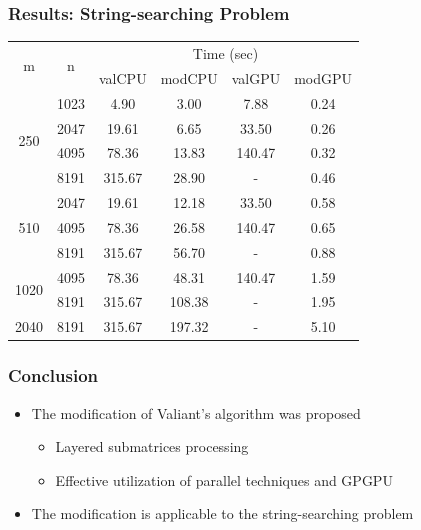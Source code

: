\documentclass[xcolor=table]{beamer}
\begin{document}
\begin{frame}
\frametitle{Results: String-searching Problem}
    
    
    \begin{center}
        \begin{tabular}{ ||c||c||c|c||c|c|| } 
        \hline
        \multirow{2}{*}{m}& \multirow{2}{*}{n} & \multicolumn{4}{c||}{Time (sec)}\\
        & & valCPU & modCPU & valGPU & modGPU \\
        \hline
        \multirow{4}{*}{250} & 1023 & 4.90 & 3.00 & 7.88 & 0.24 \\ 
        & 2047 & 19.61 & 6.65 & 33.50 & 0.26\\ 
        & 4095 & 78.36 & 13.83 & 140.47 & 0.32\\ 
        & 8191 & 315.67 & 28.90 & - & 0.46\\ 
        \hline
        \multirow{3}{*}{510} & 2047 & 19.61 & 12.18 & 33.50 & 0.58\\
        & 4095 & 78.36 & 26.58 & 140.47 & 0.65\\
        & 8191 & 315.67 & 56.70 & -  & 0.88\\ 
        \hline
        \multirow{2}{*}{1020} & 4095 & 78.36 & 48.31 & 140.47 & 1.59 \\
        & 8191 & 315.67 & 108.38 & - & 1.95\\ 
        \hline
        2040 & 8191 & 315.67 & 197.32 & - & 5.10\\ 
        \hline
        \end{tabular}
    \end{center}
    

\end{frame}


\begin{frame}[fragile] \frametitle{Conclusion}
    \begin{itemize}
        \item The modification of Valiant's algorithm was proposed
        \begin{itemize}
            \item Layered submatrices processing
            \item Effective utilization of parallel techniques and GPGPU
        \end{itemize}
        \item The modification is applicable to the string-searching problem
    \end{itemize}
\end{frame}
\end{document}
